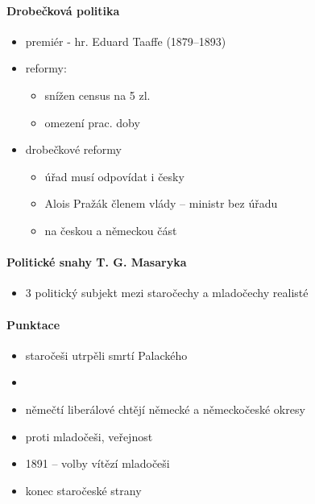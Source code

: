\paragraph{Drobečková politika}
\begin{itemize}
\item premiér - hr. Eduard Taaffe (1879--1893)
\item reformy:
	\begin{itemize}
	\item snížen census na 5 zl.
	\item omezení prac. doby
	\end{itemize}
\item drobečkové reformy
	\begin{itemize}
	\item úřad musí odpovídat i česky
	\item Alois Pražák členem vlády -- ministr bez úřadu
	\item {} na českou a německou část
	\end{itemize}
\end{itemize}

\paragraph{Politické snahy T. G. Masaryka}
\begin{itemize}
\item 3 politický subjekt mezi staročechy a mladočechy \ra realisté
\end{itemize}

\paragraph{Punktace}
\begin{itemize}
\item staročeši utrpěli smrtí Palackého
\item {}
\item němečtí liberálové chtějí německé a německočeské okresy
\item proti mladočeši, veřejnost
\item 1891 -- volby \ra vítězí mladočeši
\item konec staročeské strany
\end{itemize}

